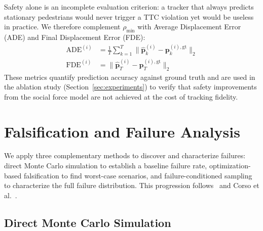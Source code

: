 \documentclass[conference]{IEEEtran}
\begin{document}
Safety alone is an incomplete evaluation criterion: a tracker that always predicts stationary pedestrians would never trigger a TTC violation yet would be useless in practice. We therefore complement $\rho_{\min}$ with Average Displacement Error (ADE) and Final Displacement Error (FDE):
\begin{align}
    \text{ADE}^{(i)} &= \frac{1}{T}\sum_{k=1}^{T}\|\hat{\mathbf{p}}_k^{(i)} - \mathbf{p}_k^{(i),\text{gt}}\|_2 \\
    \text{FDE}^{(i)} &= \|\hat{\mathbf{p}}_T^{(i)} - \mathbf{p}_T^{(i),\text{gt}}\|_2
\end{align}
These metrics quantify prediction accuracy against ground truth and are used in the ablation study (Section~\ref{sec:experiments}) to verify that safety improvements from the social force model are not achieved at the cost of tracking fidelity.

\section{Falsification and Failure Analysis}
\label{sec:falsification}

We apply three complementary methods to discover and characterize failures: direct Monte Carlo simulation to establish a baseline failure rate, optimization-based falsification to find worst-case scenarios, and failure-conditioned sampling to characterize the full failure distribution. This progression follows~\cite{kochenderfer2025validation} and Corso et al.~\cite{corso2021survey}.

\subsection{Direct Monte Carlo Simulation}
\label{sec:direct_mc}
\end{document}
